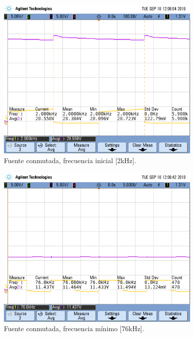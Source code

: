\begin{figure}[H]
	\centering
	\includegraphics[width=0.9\textwidth]{Imagenes/tp3_labo3.png}
\caption{Fuente conmutada, frecuencia inicial [2kHz].}
	\label{fig:fcon2}
\end{figure}

\begin{figure}[H]
	\centering
	\includegraphics[width=0.9\textwidth]{Imagenes/tp3_labo4.png}
\caption{Fuente conmutada, frecuencia mínimo [76kHz].}
	\label{fig:fcon76}
\end{figure}

